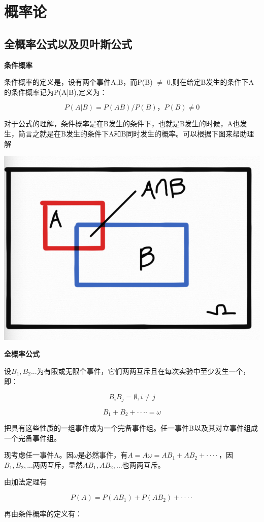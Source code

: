\documentclass{ctexart}
\begin{document}
	
	\section{概率论}
	
	\subsection{全概率公式以及贝叶斯公式}
	
	\textbf{条件概率}
	
	条件概率的定义是，设有两个事件A,B，而P(B) \(\neq\) 0,则在给定B发生的条件下A的条件概率记为P(A|B),定义为：
	
	\[P(A|B)=P(AB)/P(B)， P(B) \neq 0\]
	
	对于公式的理解，条件概率是在B发生的条件下，也就是B发生的时候，A也发生，简言之就是在B发生的条件下A和B同时发生的概率。可以根据下图来帮助理解
	
	\includegraphics[width=0.8\linewidth]{pic/AB}
	
	\mbox{}
	
	\textbf{全概率公式}
	
	设\(B_1,B_2...\)为有限或无限个事件，它们两两互斥且在每次实验中至少发生一个，即：
	
	\[B_iB_j=\emptyset, i \neq j\]
	
	\[B_1+B_2+···· = \omega\]
	
	把具有这些性质的一组事件成为一个完备事件组。任一事件B以及其对立事件组成一个完备事件组。
	
	现考虑任一事件A。因\(\omega\)是必然事件，有\(A=A\omega=AB_1+AB_2+····\)，因\(B_1,B_2,...\)两两互斥，显然\(AB_1,AB_2,...\)也两两互斥。
	
	由加法定理有
	
	\[P(A)=P(AB_1)+P(AB_2)+····\]
	
	再由条件概率的定义有：
	
\end{document}
